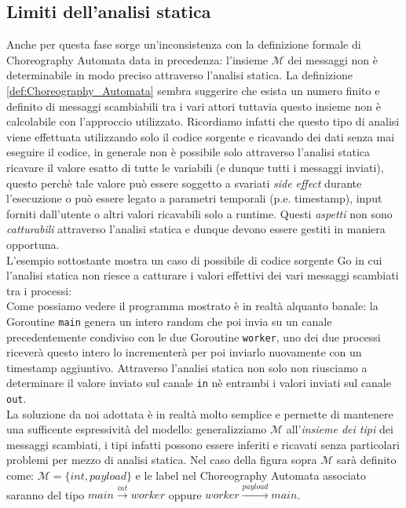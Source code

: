 \subsection{Limiti dell'analisi statica} \label{subsec:Static_Analysis_Limits}
Anche per questa fase sorge un'inconsistenza con la definizione formale di Choreography Automata data in precedenza: l'insieme $\mathcal{M}$ dei messaggi non è determinabile in modo preciso attraverso l'analisi statica. La definizione \ref{def:Choreography_Automata} sembra suggerire che esista un numero finito e definito di messaggi scambiabili tra i vari attori tuttavia questo insieme non è calcolabile con l'approccio utilizzato.
Ricordiamo infatti che questo tipo di analisi viene effettuata utilizzando solo il codice sorgente e ricavando dei dati senza mai eseguire il codice, in generale non è possibile solo attraverso l'analisi statica ricavare il valore esatto di tutte le variabili (e dunque tutti i messaggi inviati), questo perchè tale valore può essere soggetto a svariati \emph{side effect} durante l'esecuzione o può essere legato a parametri temporali (p.e. timestamp), input forniti dall'utente o altri valori ricavabili solo a runtime. Questi \emph{aspetti} non sono \emph{catturabili} attraverso l'analisi statica e dunque devono essere  gestiti in maniera opportuna. \bigskip \\
L'esempio sottostante mostra un caso di possibile di codice sorgente Go in cui l'analisi statica non riesce a catturare i valori effettivi dei vari messaggi scambiati tra i processi: \\

\bigskip
Come possiamo vedere il programma mostrato è in realtà alquanto banale: la Goroutine \texttt{main} genera un intero random che poi invia su un canale precedentemente condiviso con le due Goroutine \texttt{worker}, uno dei due processi riceverà questo intero lo incrementerà per poi inviarlo nuovamente con un timestamp aggiuntivo. Attraverso l'analisi statica non solo non riusciamo a determinare il valore inviato sul canale \texttt{in} nè entrambi i valori inviati sul canale \texttt{out}. \bigskip \\
La soluzione da noi adottata è in realtà molto semplice e permette di mantenere una sufficente espressività del modello: generalizziamo $\mathcal{M}$ all'\emph{insieme dei tipi} dei messaggi scambiati, i tipi infatti possono essere inferiti e ricavati senza particolari problemi per mezzo di analisi statica. Nel caso della figura sopra $\mathcal{M}$ sarà definito come: $\mathcal{M} = \{ int, payload \}$ e le label nel Choreography Automata associato saranno del tipo $main \xrightarrow{int} worker$ oppure $worker \xrightarrow{payload} main$.

